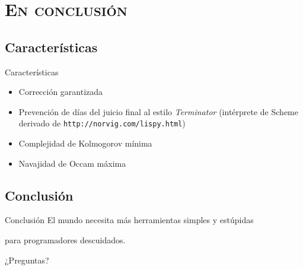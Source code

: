 \documentclass[xcolor=x11names,compress]{beamer}
\renewcommand{\(}{\begin{columns}}
\renewcommand{\)}{\end{columns}}
\newcommand{\<}[1]{\begin{column}{#1}}
\renewcommand{\>}{\end{column}}
\begin{document}
\section{\scshape En conclusión}
\subsection{Características}
\begin{frame}{Características}
    \begin{itemize}
        \item Corrección garantizada \pause
            \begin{block}
                \codeImpossible
            \end{block} \pause
        \item Prevención de días del juicio final al estilo \emph{Terminator}
            (intérprete de Scheme derivado de \texttt{http://norvig.com/lispy.html})\pause
        \item Complejidad de Kolmogorov mínima \pause
        \item Navajidad de Occam máxima
    \end{itemize}
\end{frame}

\subsection{Conclusión}
\begin{frame}{Conclusión}
    El mundo necesita más herramientas simples \pause y estúpidas\pause

    para programadores descuidados.\pause

    \vspace{1in}

    {\Large ¿Preguntas?}
\end{frame}
\end{document}
